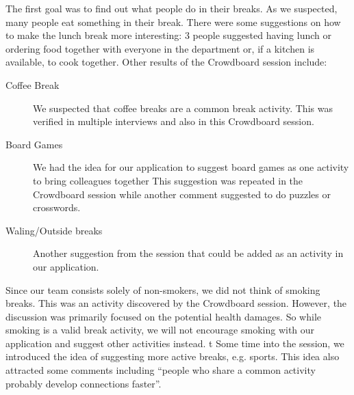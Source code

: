 The first goal was to find out what people do in their breaks. As we suspected, many people eat something in their break. There were some suggestions on how to make the lunch break more interesting: 3 people suggested having lunch or ordering food together with everyone in the department or, if a kitchen is available, to cook together. Other results of the Crowdboard session include: 
\begin{description}
  \item[Coffee Break] We suspected that coffee breaks are a common break activity. This was verified in multiple interviews and also in this Crowdboard session.
  \item[Board Games] We had the idea for our application to suggest board games as one activity to bring colleagues together This suggestion was repeated in the Crowdboard session while another comment suggested to do puzzles or crosswords.
  \item[Waling/Outside breaks] Another suggestion from the session that could be added as an activity in our application.
\end{description}

Since our team consists solely of non-smokers, we did not think of smoking breaks. This was an activity discovered by the Crowdboard session. However, the discussion was primarily focused on the potential health damages. So while smoking is a valid break activity, we will not encourage smoking with our application and suggest other activities instead.
t
Some time into the session, we introduced the idea of suggesting more active breaks, e.g. sports. This idea also attracted some comments including ``people who share a common activity probably develop
connections faster''.

